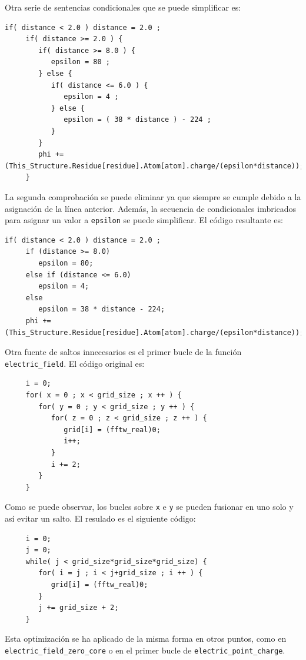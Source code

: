 Otra serie de sentencias condicionales que se puede simplificar es:

\begin{lstlisting}[]
     if( distance < 2.0 ) distance = 2.0 ;
     if( distance >= 2.0 ) {
        if( distance >= 8.0 ) {
           epsilon = 80 ;
        } else {
           if( distance <= 6.0 ) {
              epsilon = 4 ;
           } else {
              epsilon = ( 38 * distance ) - 224 ;
           }
        }
        phi += (This_Structure.Residue[residue].Atom[atom].charge/(epsilon*distance));
     }
\end{lstlisting}

La segunda comprobaci\'{o}n se puede eliminar ya que siempre se cumple debido a
la asignaci\'{o}n de la l\'{i}nea anterior. Adem\'{a}s, la secuencia de
condicionales imbricados para asignar un valor a \texttt{epsilon} se puede
simplificar. El c\'{o}digo resultante es:

\begin{lstlisting}[]
     if( distance < 2.0 ) distance = 2.0 ;
     if (distance >= 8.0)
        epsilon = 80;
     else if (distance <= 6.0)
        epsilon = 4;
     else
        epsilon = 38 * distance - 224;
     phi += (This_Structure.Residue[residue].Atom[atom].charge/(epsilon*distance));
\end{lstlisting}

Otra fuente de saltos innecesarios es el primer bucle de la funci\'{o}n
\texttt{electric\_field}. El c\'{o}digo original es:

\begin{lstlisting}
     i = 0;
     for( x = 0 ; x < grid_size ; x ++ ) {
        for( y = 0 ; y < grid_size ; y ++ ) {
           for( z = 0 ; z < grid_size ; z ++ ) {
              grid[i] = (fftw_real)0;
              i++;
           }
           i += 2;
        }
     }
\end{lstlisting}

Como se puede observar, los bucles sobre \texttt{x} e \texttt{y} se pueden
fusionar en uno solo y as\'{i} evitar un salto. El resulado es el siguiente
c\'{o}digo:

\begin{lstlisting}
     i = 0; 
     j = 0;
     while( j < grid_size*grid_size*grid_size) {
        for( i = j ; i < j+grid_size ; i ++ ) {
           grid[i] = (fftw_real)0;
        }
        j += grid_size + 2;
     }
\end{lstlisting}

Esta optimizaci\'{o}n se ha aplicado de la misma forma en otros puntos, como en
\texttt{electric\_field\_zero\_core} o en el primer bucle de
\texttt{electric\_point\_charge}.

